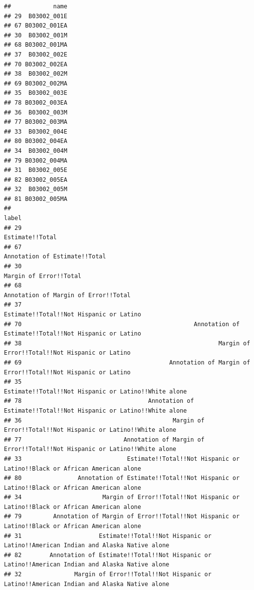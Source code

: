\documentclass[openany]{book}
\begin{document}
\begin{verbatim}
##            name
## 29  B03002_001E
## 67 B03002_001EA
## 30  B03002_001M
## 68 B03002_001MA
## 37  B03002_002E
## 70 B03002_002EA
## 38  B03002_002M
## 69 B03002_002MA
## 35  B03002_003E
## 78 B03002_003EA
## 36  B03002_003M
## 77 B03002_003MA
## 33  B03002_004E
## 80 B03002_004EA
## 34  B03002_004M
## 79 B03002_004MA
## 31  B03002_005E
## 82 B03002_005EA
## 32  B03002_005M
## 81 B03002_005MA
##                                                                                                    label
## 29                                                                                       Estimate!!Total
## 67                                                                         Annotation of Estimate!!Total
## 30                                                                                Margin of Error!!Total
## 68                                                                  Annotation of Margin of Error!!Total
## 37                                                               Estimate!!Total!!Not Hispanic or Latino
## 70                                                 Annotation of Estimate!!Total!!Not Hispanic or Latino
## 38                                                        Margin of Error!!Total!!Not Hispanic or Latino
## 69                                          Annotation of Margin of Error!!Total!!Not Hispanic or Latino
## 35                                                  Estimate!!Total!!Not Hispanic or Latino!!White alone
## 78                                    Annotation of Estimate!!Total!!Not Hispanic or Latino!!White alone
## 36                                           Margin of Error!!Total!!Not Hispanic or Latino!!White alone
## 77                             Annotation of Margin of Error!!Total!!Not Hispanic or Latino!!White alone
## 33                              Estimate!!Total!!Not Hispanic or Latino!!Black or African American alone
## 80                Annotation of Estimate!!Total!!Not Hispanic or Latino!!Black or African American alone
## 34                       Margin of Error!!Total!!Not Hispanic or Latino!!Black or African American alone
## 79         Annotation of Margin of Error!!Total!!Not Hispanic or Latino!!Black or African American alone
## 31                      Estimate!!Total!!Not Hispanic or Latino!!American Indian and Alaska Native alone
## 82        Annotation of Estimate!!Total!!Not Hispanic or Latino!!American Indian and Alaska Native alone
## 32               Margin of Error!!Total!!Not Hispanic or Latino!!American Indian and Alaska Native alone

\end{verbatim}
\end{document}
